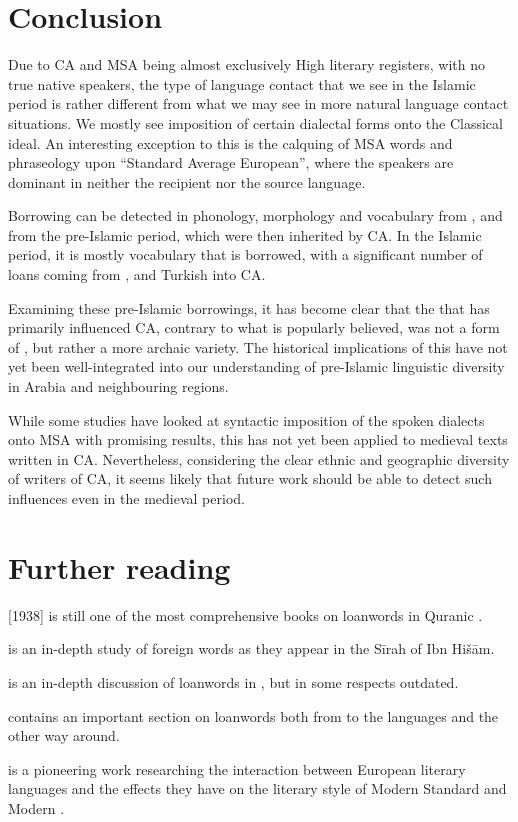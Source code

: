 \documentclass[output=paper]{langsci/langscibook}
\begin{document}
\section{Conclusion}

Due to CA and MSA being almost exclusively High literary registers, with no true native speakers, the type of language contact that we see in the Islamic period is rather different from what we may see in more natural language contact situations. We mostly see {imposition} of certain dialectal forms onto the Classical ideal. An interesting exception to this is the {calquing} of MSA words and phraseology upon “Standard Average European”, where the speakers are dominant in neither the recipient nor the {source language}.

Borrowing can be detected in phonology, morphology and vocabulary from ,  and  from the pre-Islamic period, which were then inherited by CA. In the Islamic period, it is mostly vocabulary that is borrowed, with a significant number of loans coming from ,  and  {Turkish} into CA.

Examining these pre-Islamic borrowings, it has become clear that the  that has primarily influenced CA, contrary to what is popularly believed, was not a form of , but rather a more archaic variety. The historical implications of this have not yet been well-integrated into our understanding of pre-Islamic linguistic diversity in Arabia and neighbouring regions.

While some studies have looked at syntactic {imposition} of the spoken dialects onto MSA with promising results, this has not yet been applied to medieval texts written in CA. Nevertheless, considering the clear ethnic and geographic diversity of writers of CA, it seems likely that {future} work should be able to detect such influences even in the medieval period.

\section*{Further reading}
\begin{furtherreading}
\item[\citet{Jeffrey2007}] [1938] is still one of the most comprehensive books on {loanwords} in Quranic .
\item[\citet{Hebbo1984}] is an in-depth study of foreign words as they appear in the Sīrah of Ibn Hišām.
\item[\citet{Fraenkel1886}] is an in-depth discussion of  {loanwords} in , but in some respects outdated.
\item[\citet{Nöldeke1910}] contains an important section on {loanwords} both from  to the  languages and the other way around.
\item[\citet{Blau1969}] is a pioneering work researching the interaction between European literary languages and the effects they have on the literary style of Modern Standard  and Modern .
\end{furtherreading}
\end{document}
